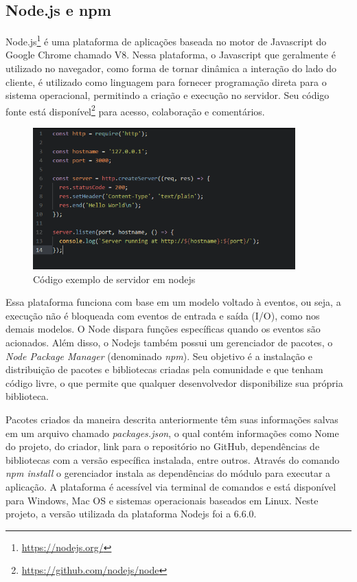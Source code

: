 \subsection{Node.js e npm}\label{sec:node-js}

Node.js\footnote{\url{https://nodejs.org/}} é uma plataforma de aplicações baseada no motor de Javascript do Google Chrome chamado V8\cite{nodejs}. Nessa plataforma, o Javascript que geralmente é utilizado no navegador, como forma de tornar dinâmica a interação do lado do cliente, é utilizado como linguagem para fornecer programação direta para o sistema operacional, permitindo a criação e execução no servidor. Seu código fonte está disponível\footnote{\url{https://github.com/nodejs/node}} para acesso, colaboração e comentários.
\begin{figure}[htb]
	\caption{\label{fig:codejs}Código exemplo de servidor em nodejs}
	\begin{center}
		\includegraphics[width=0.90\textwidth]{img/codejs.png}
	\end{center}
\end{figure}
Essa plataforma funciona com base em um modelo voltado à eventos, ou seja, a execução não é bloqueada com eventos de entrada e saída (I/O), como nos demais modelos. O Node dispara funções específicas quando os eventos são acionados. Além disso, o Nodejs também possui um gerenciador de pacotes, o \textit{Node Package Manager} (denominado \textit{npm}). Seu objetivo é a instalação e distribuição de pacotes e bibliotecas criadas pela comunidade e que tenham código livre, o que permite que qualquer desenvolvedor disponibilize sua própria biblioteca.

Pacotes criados da maneira descrita anteriormente têm suas informações salvas em um arquivo chamado \textit{packages.json}, o qual contém informações como Nome do projeto, do criador, link para o repositório no GitHub, dependências de bibliotecas com a versão específica instalada, entre outros. Através do comando \textit{npm install} o gerenciador instala as dependências do módulo para executar a aplicação. A plataforma é acessível via terminal de comandos e está disponível para Windows, Mac OS e sistemas operacionais baseados em Linux. Neste projeto, a versão utilizada da plataforma Nodejs foi a 6.6.0. 



